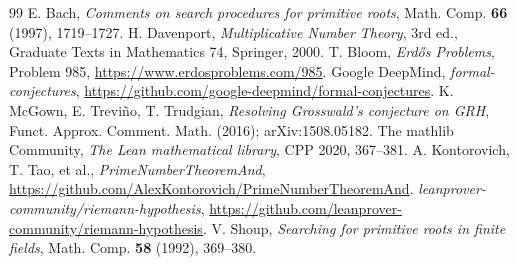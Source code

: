 \documentclass[11pt]{amsart}
\theoremstyle{definition}
\theoremstyle{remark}
\begin{document}
\begin{thebibliography}{99}
 E. Bach, \emph{Comments on search procedures for primitive roots}, Math. Comp. \textbf{66} (1997), 1719--1727.
 H. Davenport, \emph{Multiplicative Number Theory}, 3rd ed., Graduate Texts in Mathematics 74, Springer, 2000.
 T. Bloom, \emph{Erd\H{o}s Problems}, Problem 985, \url{https://www.erdosproblems.com/985}.
 Google DeepMind, \emph{formal-conjectures}, \url{https://github.com/google-deepmind/formal-conjectures}.
 K. McGown, E. Trevi\~no, T. Trudgian, \emph{Resolving Grosswald's conjecture on GRH}, Funct. Approx. Comment. Math. (2016); arXiv:1508.05182.
 The mathlib Community, \emph{The Lean mathematical library}, CPP 2020, 367--381.
 A. Kontorovich, T. Tao, et al., \emph{PrimeNumberTheoremAnd}, \url{https://github.com/AlexKontorovich/PrimeNumberTheoremAnd}.
 \emph{leanprover-community/riemann-hypothesis}, \url{https://github.com/leanprover-community/riemann-hypothesis}.
 V. Shoup, \emph{Searching for primitive roots in finite fields}, Math. Comp. \textbf{58} (1992), 369--380.
\end{thebibliography}
\end{document}
